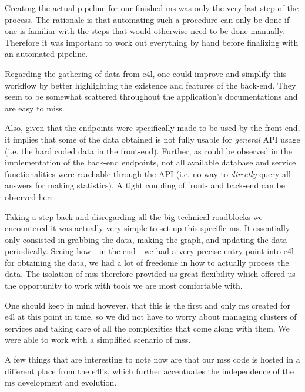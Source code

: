 Creating the actual pipeline for our finished \gls{ms} was only the
very last step of the process. The rationale is that automating such a
procedure can only be done if one is familiar with the steps that
would otherwise need to be done manually. Therefore it was important
to work out everything by hand before finalizing with an automated
pipeline.

Regarding the gathering of data from \gls{e4l}, one could improve and
simplify this workflow by better highlighting the existence and
features of the back-end. They seem to be somewhat scattered
throughout the application's documentations and are easy to miss.

Also, given that the endpoints were specifically made to be used by
the front-end, it implies that some of the data obtained is not fully
usable for \textit{general} API usage (i.e. the hard coded data in the
front-end). Further, as could be observed in the implementation of the
back-end endpoints, not all available database and service
functionalities were reachable through the API (i.e. no way to
\emph{directly} query all answers for making statistics). A tight coupling of
front- and back-end can be observed here.

Taking a step back and disregarding all the big technical roadblocks
we encountered it was actually very simple to set up
this specific \gls{ms}. It essentially only consisted in grabbing the
data, making the graph, and updating the data periodically. Seeing
how---in the end---we had a very precise entry point into \gls{e4l}
for obtaining the data, we had a lot of freedome in how to actually
process the data. The isolation of \glspl{ms} therefore provided us
great flexibility which offered us the opportunity to work with tools
we are most comfortable with.

One should keep in mind however, that this is the first and only
\gls{ms} created for \gls{e4l} at this point in time, so we did not
have to worry about managing clusters of services and taking care of
all the complexities that come along with them. We were able to work
with a simplified scenario of \glspl{ms}.


A few things that are interesting to note now are that our \glspl{ms}
code is hosted in a different place from the \gls{e4l}'s, which further
accentuates the independence of the \gls{ms} development and evolution.

